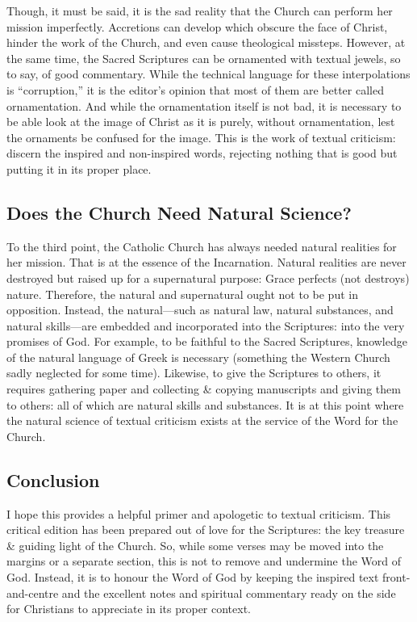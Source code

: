 \begin{onecolumn}
Though, it must be said, it is the sad reality that the Church can perform her mission imperfectly. Accretions can develop which obscure the face of Christ, hinder the work of the Church, and even cause theological missteps. However, at the same time, the Sacred Scriptures can be ornamented with textual jewels, so to say, of good commentary. While the technical language for these interpolations is ``corruption,'' it is the editor's opinion that most of them are better called ornamentation. And while the ornamentation itself is not bad, it is necessary to be able look at the image of Christ as it is purely, without ornamentation, lest the ornaments be confused for the image. This is the work of textual criticism: discern the inspired and non-inspired words, rejecting nothing that is good but putting it in its proper place.

\subsection{Does the Church Need Natural Science?}
To the third point, the Catholic Church has always needed natural realities for her mission. That is at the essence of the Incarnation. Natural realities are never destroyed but raised up for a supernatural purpose: Grace perfects (not destroys) nature. Therefore, the natural and supernatural ought not to be put in opposition. Instead, the natural---such as natural law, natural substances, and natural skills---are embedded and incorporated into the Scriptures: into the very promises of God. For example, to be faithful to the Sacred Scriptures, knowledge of the natural language of Greek is necessary (something the Western Church sadly neglected for some time). Likewise, to give the Scriptures to others, it requires gathering paper and collecting \& copying manuscripts and giving them to others: all of which are natural skills and substances. It is at this point where the natural science of textual criticism exists at the service of the Word for the Church.
\subsection{Conclusion}
I hope this provides a helpful primer and apologetic to textual criticism. This critical edition has been prepared out of love for the Scriptures: the key treasure \& guiding light of the Church. So, while some verses may be moved into the margins or a separate section, this is not to remove and undermine the Word of God. Instead, it is to honour the Word of God by keeping the inspired text front-and-centre and the excellent notes and spiritual commentary ready on the side for Christians to appreciate in its proper context.
\end{onecolumn}